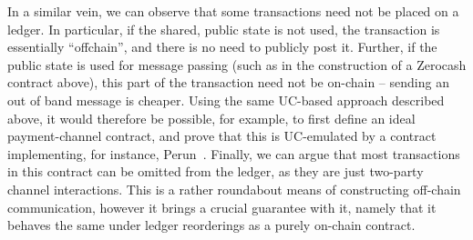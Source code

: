 In a similar vein, we can observe that some transactions need not be placed on a
ledger. In particular, if the shared, public state is not used, the transaction
is essentially ``off\-chain'', and there is no need to publicly post it. Further,
if the public state is used for message passing (such as in the construction of
a Zerocash contract above), this part of the transaction need not be on-chain --
sending an out of band message is cheaper. Using the same UC-based approach
described above, it would therefore be possible, for example, to first define an
ideal payment-channel contract, and prove that this is UC-emulated by a contract
implementing, for instance, Perun~\cite{SP:DEFM19}. Finally, we can argue that most
transactions in this contract can be omitted from the ledger, as they are just
two-party channel interactions. This is a rather roundabout means of
constructing off-chain communication, however it brings a crucial guarantee with
it, namely that it behaves the same under ledger reorderings as a purely
on-chain contract.

